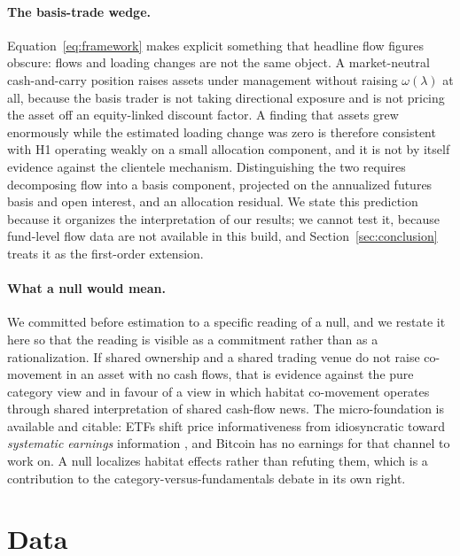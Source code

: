 \documentclass[12pt,a4paper]{article}
\begin{document}
\paragraph{The basis-trade wedge.} Equation~\eqref{eq:framework} makes explicit something that headline flow figures obscure: flows and loading changes are not the same object. A market-neutral cash-and-carry position raises assets under management without raising $\omega(\lambda)$ at all, because the basis trader is not taking directional exposure and is not pricing the asset off an equity-linked discount factor. A finding that assets grew enormously while the estimated loading change was zero is therefore consistent with H1 operating weakly on a small allocation component, and it is not by itself evidence against the clientele mechanism. Distinguishing the two requires decomposing flow into a basis component, projected on the annualized futures basis and open interest, and an allocation residual. We state this prediction because it organizes the interpretation of our results; we cannot test it, because fund-level flow data are not available in this build, and Section~\ref{sec:conclusion} treats it as the first-order extension.

\paragraph{What a null would mean.} We committed before estimation to a specific reading of a null, and we restate it here so that the reading is visible as a commitment rather than as a rationalization. If shared ownership and a shared trading venue do not raise co-movement in an asset with no cash flows, that is evidence against the pure category view and in favour of a view in which habitat co-movement operates through shared interpretation of shared cash-flow news. The micro-foundation is available and citable: ETFs shift price informativeness from idiosyncratic toward \emph{systematic earnings} information \citep{glosten2020etf}, and Bitcoin has no earnings for that channel to work on. A null localizes habitat effects rather than refuting them, which is a contribution to the category-versus-fundamentals debate in its own right.

\section{Data}\label{sec:data}
\end{document}
